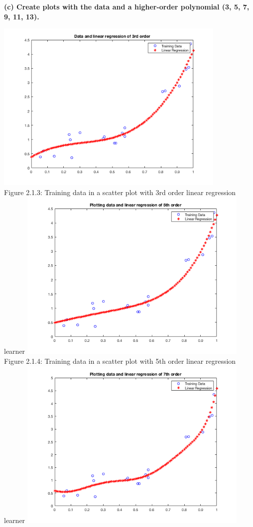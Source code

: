 \documentclass[]{scrreprt}   %
\begin{document}
\textbf{(c) Create plots with the data and a higher-order polynomial (3, 5, 7, 9, 11, 13).}
\begin{center}
	\includegraphics[width=30em,keepaspectratio]{p1figure3.png}\\
	{Figure 2.1.3: Training data in a scatter plot with 3rd order linear regression learner}
	\includegraphics[width=30em,keepaspectratio]{p1figure4.png}\\
	{Figure 2.1.4: Training data in a scatter plot with 5th order linear regression learner}
	\includegraphics[width=30em,keepaspectratio]{p1figure5.png}\\

\end{center}
\end{document}
